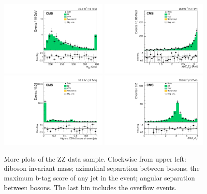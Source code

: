 \clearpage
\begin{figure}[!h]
\centering
\includegraphics[width=0.48\textwidth]{figures/dibosons/zz4l/mZZ.pdf}
\includegraphics[width=0.48\textwidth]{figures/dibosons/zz4l/dphiZZ.pdf}
\includegraphics[width=0.48\textwidth]{figures/dibosons/zz4l/bDiscrMax.pdf}
\includegraphics[width=0.48\textwidth]{figures/dibosons/zz4l/dRZ1Z2.pdf}
\caption{More plots of the ZZ data sample.
Clockwise from upper left: diboson invariant mass; azimuthal separation between bosons; the maximum b-tag score of any jet in the event; angular separation between bosons.
The last bin includes the overflow events.
\label{fig:zz4l_moreplots}}
\end{figure}

